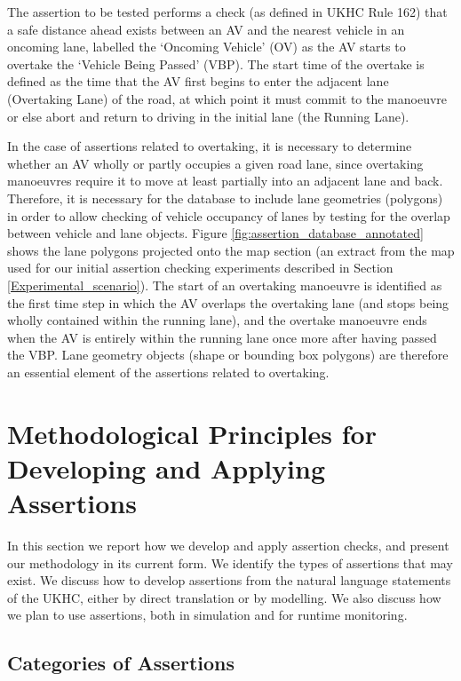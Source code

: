 The assertion to be tested performs a check (as defined in UKHC Rule 162) that a safe distance ahead exists between an AV and the nearest vehicle in an oncoming lane, labelled the `Oncoming Vehicle' (OV) as the AV starts to overtake the `Vehicle Being Passed' (VBP). The start time of the overtake is defined as the time that the AV first begins to enter the adjacent lane (Overtaking Lane) of the road, at which point it must commit to the manoeuvre or else abort and return to driving in the initial lane (the Running Lane). 

In the case of assertions related to overtaking, it is necessary to determine whether an AV wholly or partly occupies a given road lane, since overtaking manoeuvres require it to move at least partially into an adjacent lane and back. Therefore, it is necessary for the database to include lane geometries (polygons) in order to allow checking of vehicle occupancy of lanes by testing for the overlap between vehicle and lane objects. Figure \ref{fig:assertion_database_annotated} shows the lane polygons projected onto the map section (an extract from the map used for our initial assertion checking experiments described in Section \ref{Experimental_scenario}). The start of an overtaking manoeuvre is identified as the first time step in which the AV overlaps the overtaking lane (and stops being wholly contained within the running lane), and the overtake manoeuvre ends when the AV is entirely within the running lane once more after having passed the VBP. Lane geometry objects (shape or bounding box polygons) are therefore an essential element of the assertions related to overtaking.

\section{Methodological Principles for Developing and Applying Assertions} \label{Use_of_assertions}
In this section we report how we develop and apply assertion checks, and present our methodology in its current form. We identify the types of assertions that may exist. We discuss how to develop assertions from the natural language statements of the UKHC, either by direct translation or by modelling. We also discuss how we plan to use assertions, both in simulation and for runtime monitoring.

\subsection{Categories of Assertions} \label{assertion_categories}

